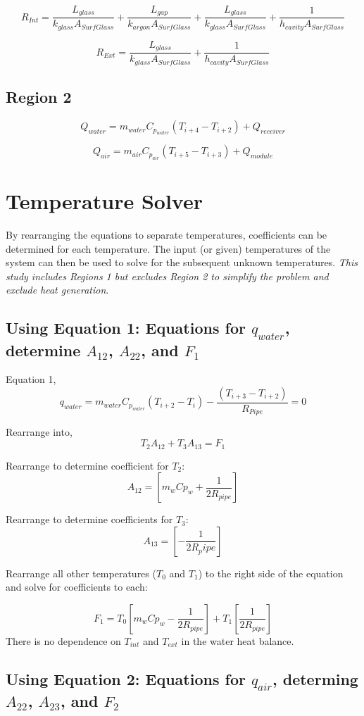 \documentclass[12pt]{report}
\begin{document}
$$ R_{Int} = \frac{L_{glass}}{k_{glass}  A_{SurfGlass}} 
	+ \frac{L_{gap}}{k_{argon}  A_{SurfGlass}} 
	+ \frac{L_{glass}}{k_{glass}  A_{SurfGlass}} + \frac{1}{h_{cavity} A_{SurfGlass}}$$
	
$$ R_{Ext} = \frac{L_{glass}}{k_{glass}  A_{SurfGlass}} + \frac{1}{h_{cavity} A_{SurfGlass}}$$

\subsection{Region 2}

$$ Q_{water} = m_{water} C_{p_{water}} (T_{i+4} - T_{i+2}) + Q_{receiver} $$

$$ Q_{air} = m_{air} C_{p_{air}} (T_{i+5} - T_{i+3}) + Q_{module} $$
        
\section{Temperature Solver}
By rearranging the equations to separate temperatures, coefficients can be determined for each temperature. The input (or given) temperatures of the system can then be used to solve for the subsequent unknown temperatures. \textit{This study includes Regions 1 but excludes Region 2 to simplify the problem and exclude heat generation}.

\subsection{Using Equation 1: Equations for $q_{water}$, determine $A_{12}$, $A_{22}$, and $F_1$}

Equation 1, 
$$q_{water} = m_{water} C_{p_{water}} (T_{i+2}-T_i) - 
	\frac
	{\left( 
		T_{i+3} - T_{i+2} 
		\right)}
	{R_{Pipe}}
	= 0 $$

Rearrange into,
$$ T_2 A_{12} + T_3 A_{13} = F_1 $$

Rearrange to determine coefficient for $T_2$:
$$ A_{12} = [m_w Cp_w + \frac{1}{2 R_{pipe}}] $$

Rearrange to determine coefficients for $T_3$:
$$ A_{13} = [- \frac{1}{2 R_pipe}] $$

Rearrange all other temperatures ($T_0$ and $T_1$) to the right side of the equation and solve for coefficients to each:

$$ F_1 = 
	T_0 [m_w Cp_w - \frac{1}{2 R_{pipe}}]
	+ T_1 [\frac{1}{2 R_{pipe}}]$$
There is no dependence on $T_{int}$ and $T_{ext}$ in the water heat balance.

\subsection{Using Equation 2: Equations for $q_{air}$, determing $A_{22}$, $A_{23}$, and $F_2$}
\end{document}
